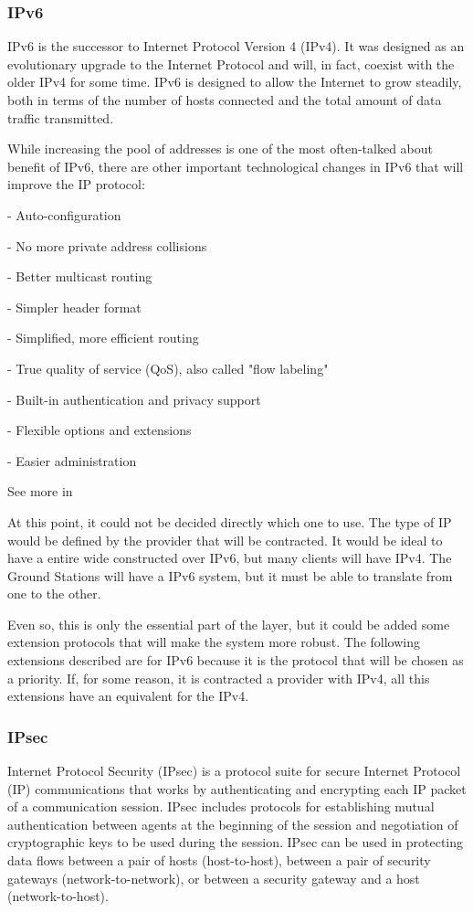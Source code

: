 \subsubsection{IPv6}
IPv6 is the successor to Internet Protocol Version 4 (IPv4). It was designed as an evolutionary upgrade to the Internet Protocol and will, in fact, coexist with the older IPv4 for some time. IPv6 is designed to allow the Internet to grow steadily, both in terms of the number of hosts connected and the total amount of data traffic transmitted.

While increasing the pool of addresses is one of the most often-talked about benefit of IPv6, there are other important technological changes in IPv6 that will improve the IP protocol:
\begin{list}{}{}
\item - Auto-configuration
\item - No more private address collisions
\item - Better multicast routing
\item - Simpler header format
\item - Simplified, more efficient routing
\item - True quality of service (QoS), also called "flow labeling"
\item - Built-in authentication and privacy support
\item - Flexible options and extensions
\item - Easier administration 
\end{list}

See more in \cite{IP_TCP_UDP}

At this point, it could not be decided directly which one to use. The type of IP would be defined by the provider that will be contracted. It would be ideal to have a entire wide constructed over IPv6, but many clients will have IPv4. The Ground Stations will have a IPv6 system, but it must be able to translate from one to the other.

Even so, this is only the essential part of the layer, but it could be added some extension protocols that will make the system more robust. The following extensions described are for IPv6 because it is the protocol that will be chosen as a priority. If, for some reason, it is contracted a provider with IPv4, all this extensions have an equivalent for the IPv4.

\subsubsection{IPsec}
Internet Protocol Security (IPsec) is a protocol suite for secure Internet Protocol (IP) communications that works by authenticating and encrypting each IP packet of a communication session. IPsec includes protocols for establishing mutual authentication between agents at the beginning of the session and negotiation of cryptographic keys to be used during the session. IPsec can be used in protecting data flows between a pair of hosts (host-to-host), between a pair of security gateways (network-to-network), or between a security gateway and a host (network-to-host). 

